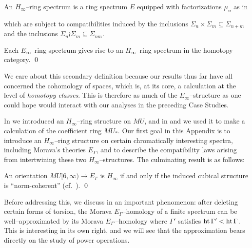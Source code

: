 \begin{definition}
An \(H_\infty\)--ring spectrum is a ring spectrum \(E\) equipped with factorizations \(\mu_n\) as in
\begin{center}
\end{center}
which are subject to compatibilities induced by the inclusions \(\Sigma_n \times \Sigma_m \subseteq \Sigma_{n+m}\) and the inclusions \(\Sigma_n \wr \Sigma_m \subseteq \Sigma_{nm}\).
\end{definition}

\begin{lemma}
Each \(E_\infty\)--ring spectrum gives rise to an \(H_\infty\)--ring spectrum in the homotopy category. \qed
\end{lemma}

\noindent We care about this secondary definition because our results thus far have all concerned the cohomology of spaces, which is, at its core, a calculation at the level of \emph{homotopy classes}.  This is therefore as much of the \(E_\infty\)--structure as one could hope would interact with our analyses in the preceding Case Studies.

In  we introduced an \(H_\infty\)--ring structure on \(MU\), and in  and  we used it to make a calculation of the coefficient ring \(MU_*\).  Our first goal in this Appendix is to introduce an \(H_\infty\)--ring structure on certain chromatically interesting spectra, including Morava's theories \(E_\Gamma\), and to describe the compatibility laws arising from intertwining these two \(H_\infty\)--structures.  The culminating result is as follows:

\begin{theorem}
An orientation \(MU[6, \infty) \to E_\Gamma\) is \(H_\infty\) if and only if the induced cubical structure is ``norm-coherent'' (cf.\ ). \qed
\end{theorem}

\noindent Before addressing this, we discuss in  an important phenomenon: after deleting certain forms of torsion, the Morava \(E_\Gamma\)--homology of a finite spectrum can be well--approximated by its Morava \(E_{\Gamma'}\)--homology where \(\Gamma'\) satisfies \(\operatorname{ht}{\Gamma'} < \operatorname{ht}{\Gamma}\).  This is interesting in its own right, and we will see that the approximation bears directly on the study of power operations.

